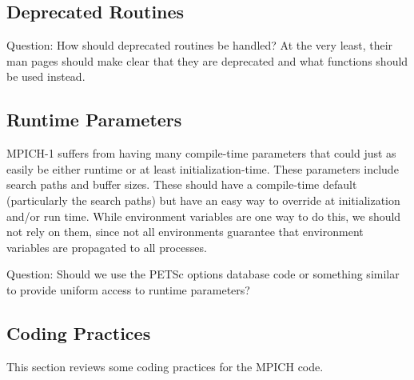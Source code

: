 \documentclass{article}
\begin{document}
\subsection{Deprecated Routines}
Question:  How should deprecated routines be handled?  At the very
least, their man pages should make clear that they are deprecated and
what functions should be used instead.

\subsection{Runtime Parameters}
MPICH-1 suffers from having many compile-time parameters that could just as
easily be either runtime or at least initialization-time.  These parameters
include search paths and buffer sizes.  These should have a compile-time
default (particularly the search paths) but have an easy way to override at
initialization and/or run time.  While environment variables are one way to do
this, we should not rely on them, since not all environments guarantee that
environment variables are propagated to all processes.

Question: Should we use the PETSc options database code or something similar
to provide uniform access to runtime parameters?  

\subsection{Coding Practices}
This section reviews some coding practices for the MPICH code.
\end{document}
